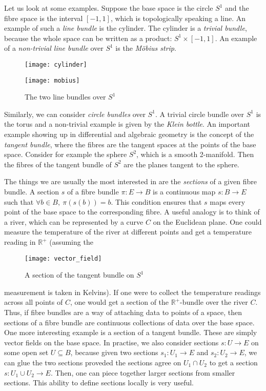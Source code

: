Let us look at some examples. Suppose the base space is the circle $S^{1}$
and the fibre space is the interval $[-1, 1]$, which is topologically
speaking a line. An example of such a \emph{line bundle} is the cylinder.
The cylinder is a \emph{trivial bundle}, because the whole space can
be written as a product: $S^{1}\times [-1,1]$. An example of a
\emph{non-trivial line bundle} over $S^{1}$ is the \emph{Möbius strip}.
\begin{figure}[H]
  \centering
  \begin{minipage}{.45\textwidth}
    \centering
    \texttt{[image: cylinder]}
  \end{minipage}%
  \begin{minipage}{.45\textwidth}
    \centering
    \texttt{[image: mobius]}
  \end{minipage}
  \caption{The two line bundles over $S^{1}$}
\end{figure}
Similarly, we can consider \emph{circle bundles} over $S^{1}$. A trivial
circle bundle over $S^{1}$ is the torus and a non-trivial example is given
by the \emph{Klein bottle}.
An important example showing up in differential and algebraic geometry
is the concept of the \emph{tangent bundle}, where the fibres are the
tangent spaces at the points of the base space. Consider for example the
sphere $S^{2}$, which is a smooth 2-manifold. Then the fibres of the tangent
bundle of $S^{2}$ are the planes tangent to the sphere.

The things we are usually the most interested in are the \emph{sections} of
a given fibre bundle. A section $s$ of a fibre bundle $\pi:E\to B$
is a continuous map $s:B\to E$ such that $\forall b\in B,\ \pi(s(b))=b$.
This condition ensures that $s$ maps every point of the base space to the
corresponding fibre. A useful analogy is to think of a river, which can
be represented by a curve $C$ on the Euclidean plane. One could measure the
temperature of the river at different points and get a temperature reading
in $\mathbb{R}^{+}$ (assuming the
\begin{wrapfigure}{r}{0.3\textwidth}
  \centering
  \texttt{[image: vector\_field]}
  \caption{A section of the tangent bundle on $S^{1}$}
\end{wrapfigure}
 measurement is taken in Kelvins).
If one were to collect the temperature readings across all points of $C$,
one would get a section of the $\mathbb{R}^{+}$-bundle over the river $C$.
Thus, if fibre bundles are a way of attaching data to points of a space,
then sections of a fibre bundle are continuous collections of data over the
base space. One more interesting example is a section of a tangent bundle.
These are simply vector fields on the base space.
In practise, we also consider sections $s:U\to E$ on some open set
$U\subseteq B$, because given two sections $s_{1}:U_{1}\to E$ and
$s_{2}:U_{2}\to E$, we can glue the two sections proveded the sections
agree on $U_{1}\cap U_{2}$ to get a section $s:U_{1}\cup U_{2}\to E$.
Then, one can piece together larger sections from smaller sections. This
ability to define sections locally is very useful.

